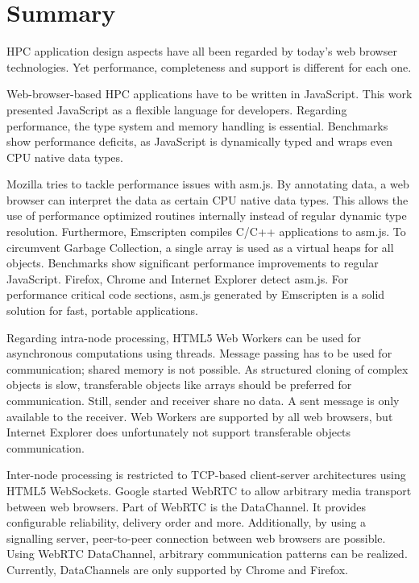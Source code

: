\section{Summary} \label{chapter_summary}

HPC application design aspects have all been regarded by today's web browser technologies. Yet performance, completeness and support is different for each one.

Web-browser-based HPC applications have to be written in JavaScript. This work presented JavaScript as a flexible language for developers. Regarding performance, the type system and memory handling is essential. Benchmarks show performance deficits, as JavaScript is dynamically typed and wraps even CPU native data types.

Mozilla tries to tackle performance issues with asm.js. By annotating data, a web browser can interpret the data as certain CPU native data types. This allows the use of performance optimized routines internally instead of regular dynamic type resolution. Furthermore, Emscripten compiles C/C++ applications to asm.js. To circumvent Garbage Collection, a single array is used as a virtual heaps for all objects. Benchmarks show significant performance improvements to regular JavaScript. Firefox, Chrome and Internet Explorer detect asm.js. For performance critical code sections, asm.js generated by Emscripten is a solid solution for fast, portable applications.

Regarding intra-node processing, HTML5 Web Workers can be used for asynchronous computations using threads. Message passing has to be used for communication; shared memory is not possible. As structured cloning of complex objects is slow, transferable objects like arrays should be preferred for communication. Still, sender and receiver share no data. A sent message is only available to the receiver. Web Workers are supported by all web browsers, but Internet Explorer does unfortunately not support transferable objects communication.

Inter-node processing is restricted to TCP-based client-server architectures using HTML5 WebSockets. Google started WebRTC to allow arbitrary media transport between web browsers. Part of WebRTC is the DataChannel. It provides configurable reliability, delivery order and more. Additionally, by using a signalling server, peer-to-peer connection between web browsers are possible. Using WebRTC DataChannel, arbitrary communication patterns can be realized. Currently, DataChannels are only supported by Chrome and Firefox.


